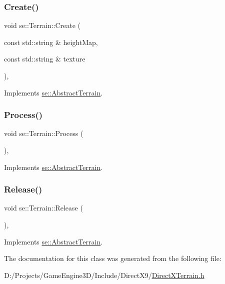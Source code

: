 \subsubsection{\texorpdfstring{Create()}{Create()}}
{\footnotesize\ttfamily void se\+::\+Terrain\+::\+Create (\begin{DoxyParamCaption}\item[{const std\+::string \&}]{height\+Map,  }\item[{const std\+::string \&}]{texture }\end{DoxyParamCaption})\hspace{0.3cm}{\ttfamily [override]}, {\ttfamily [virtual]}}



Implements \mbox{\hyperlink{classse_1_1_abstract_terrain_ac8254489e68bcfc1960b968afeb683b0}{se\+::\+Abstract\+Terrain}}.

\mbox{\label{classse_1_1_terrain_aa4eeb1886f46d2f33e1633b6f7c7345c}} 
\subsubsection{\texorpdfstring{Process()}{Process()}}
{\footnotesize\ttfamily void se\+::\+Terrain\+::\+Process (\begin{DoxyParamCaption}{ }\end{DoxyParamCaption})\hspace{0.3cm}{\ttfamily [override]}, {\ttfamily [virtual]}}



Implements \mbox{\hyperlink{classse_1_1_abstract_terrain_af2f0249eead2b62a82baa2ecbb52efeb}{se\+::\+Abstract\+Terrain}}.

\mbox{\label{classse_1_1_terrain_a61004e3426795d93190fe8d1f4159759}} 
\subsubsection{\texorpdfstring{Release()}{Release()}}
{\footnotesize\ttfamily void se\+::\+Terrain\+::\+Release (\begin{DoxyParamCaption}{ }\end{DoxyParamCaption})\hspace{0.3cm}{\ttfamily [override]}, {\ttfamily [virtual]}}



Implements \mbox{\hyperlink{classse_1_1_abstract_terrain_aeee5b6c81be6aee211819b8d79718bf5}{se\+::\+Abstract\+Terrain}}.



The documentation for this class was generated from the following file\+:\begin{DoxyCompactItemize}
\item 
D\+:/\+Projects/\+Game\+Engine3\+D/\+Include/\+Direct\+X9/\mbox{\hyperlink{_direct_x_terrain_8h}{Direct\+X\+Terrain.\+h}}\end{DoxyCompactItemize}
